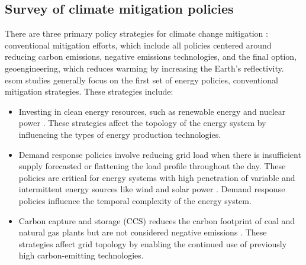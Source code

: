 \subsection{Survey of climate mitigation policies}

There are three primary policy strategies for climate change mitigation \cite{fawzy_strategies_2020}:
conventional mitigation efforts, which include all policies centered around
reducing carbon emissions, negative emissions technologies, and the final option,
geoengineering, which reduces warming by increasing the Earth’s reflectivity. \gls{esom}
studies generally focus on the first set of energy policies, conventional mitigation strategies.
These strategies include:
\begin{itemize}
  \item Investing in clean energy resources, such as renewable energy and nuclear power
  \cite{fawzy_strategies_2020}. These strategies affect the topology of the energy
  system by influencing the types of energy production technologies.
  \item Demand response policies involve reducing grid load when there is insufficient
  supply forecasted or flattening the load profile throughout the day. These policies
  are critical for energy systems with high penetration of variable and intermittent
  energy sources like wind and solar power \cite{bouckaert_expanding_2014,
  kuzemko_policies_2017}. Demand response policies influence the temporal
  complexity of the energy system.
  \item Carbon capture and storage (CCS) reduces the carbon footprint of coal and
  natural gas plants but are not considered negative emissions \cite{fawzy_strategies_2020}.
  These strategies affect grid topology by enabling the continued use of previously
  high carbon-emitting technologies.
\end{itemize}


